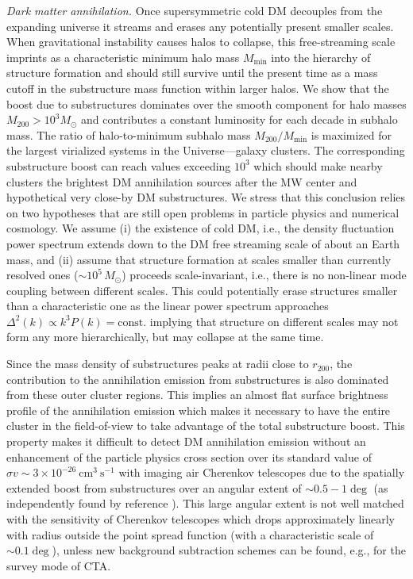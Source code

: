 \documentclass[10pt,aps,pra,reprint,amsmath,amsfonts,amssymb,showpacs,nofootinbib,floatfix]{revtex4-1}
\newcommand{\rmn}{\mathrm}
\newcommand{\msun}{M_\odot}
\newcommand{\rvir}{r_{200}}
\newcommand{\mvir}{M_{200}}
\begin{document}
{\em Dark matter annihilation.} Once supersymmetric cold DM decouples from the
expanding universe it streams and erases any potentially present smaller
scales. When gravitational instability causes halos to collapse, this
free-streaming scale imprints as a characteristic minimum halo mass
$M_\mathrm{min}$ into the hierarchy of structure formation and should still
survive until the present time as a mass cutoff in the substructure mass
function within larger halos. We show that the boost due to substructures
dominates over the smooth component for halo masses $\mvir>10^3 \msun$ and
contributes a constant luminosity for each decade in subhalo mass. The ratio of
halo-to-minimum subhalo mass $\mvir/M_\mathrm{min}$ is maximized for the largest
virialized systems in the Universe---galaxy clusters. The corresponding
substructure boost can reach values exceeding $10^3$ which should make nearby
clusters the brightest DM annihilation sources after the MW center and
hypothetical very close-by DM substructures. We stress that this conclusion
relies on two hypotheses that are still open problems in particle physics and
numerical cosmology. We assume (i) the existence of cold DM, i.e., the density
fluctuation power spectrum extends down to the DM free streaming scale of about
an Earth mass, and (ii) assume that structure formation at scales smaller than
currently resolved ones ($\sim 10^5\,\msun$) proceeds scale-invariant, i.e.,
there is no non-linear mode coupling between different scales. This could
potentially erase structures smaller than a characteristic one as the linear
power spectrum approaches $\Delta^2(k) \propto k^3 P(k)=\rmn{const.}$ implying
that structure on different scales may not form any more hierarchically, but may
collapse at the same time.

Since the mass density of substructures peaks at radii close to $\rvir$, the
contribution to the annihilation emission from substructures is also dominated
from these outer cluster regions.  This implies an almost flat surface
brightness profile of the annihilation emission which makes it necessary to have
the entire cluster in the field-of-view to take advantage of the total
substructure boost. This property makes it difficult to detect DM annihilation
emission without an enhancement of the particle physics cross section over its
standard value of $\sigma v\sim 3\times 10^{-26} ~\mathrm{cm}^3~\mathrm{s}^{-1}$
with imaging air Cherenkov telescopes due to the spatially extended boost from
substructures over an angular extent of $\sim 0.5-1\deg$ (as independently found
by reference \cite{2011arXiv1104.3530S}). This large angular extent is not well
matched with the sensitivity of Cherenkov telescopes which drops approximately
linearly with radius outside the point spread function (with a characteristic
scale of $\sim 0.1\deg$), unless new background subtraction schemes can be
found, e.g., for the survey mode of CTA.
\end{document}
